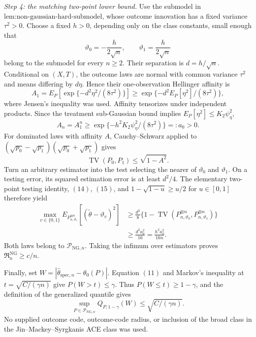 \emph{Step 4: the matching two-point lower bound.}
Use the submodel in \(\text{lem:non-gaussian-hard-submodel}\), whose outcome innovation has a fixed variance \(\tau^2>0\). Choose a fixed \(h>0\), depending only on the class constants, small enough that
\[
 \vartheta_0=-\frac{h}{2\sqrt n},
 \qquad
 \vartheta_1=\frac{h}{2\sqrt n}
\]
belong to the submodel for every \(n\ge2\). Their separation is \(d=h/\sqrt n\). Conditional on \((X,T)\), the outcome laws are normal with common variance \(\tau^2\) and means differing by \(d\eta\). Hence their one-observation Hellinger affinity is
\[
 A_1=E_P\!\left[\exp\{-d^2\eta^2/(8\tau^2)\}\right]
 \ge \exp\{-d^2E_P[\eta^2]/(8\tau^2)\}, \tag{13}
\]
where Jensen's inequality was used. Affinity tensorizes under independent products. Since the treatment sub-Gaussian bound implies \(E_P[\eta^2]\le K_2\psi_{\eta}^2\),
\[
 A_n=A_1^n
 \ge \exp\{-h^2K_2\psi_{\eta}^2/(8\tau^2)\}
 =:a_0>0. \tag{14}
\]
For dominated laws with affinity \(A\), Cauchy--Schwarz applied to \((\sqrt{p_0}-\sqrt{p_1})(\sqrt{p_0}+\sqrt{p_1})\) gives
\[
 \operatorname{TV}(P_0,P_1)\le\sqrt{1-A^2}. \tag{15}
\]
Turn an arbitrary estimator into the test selecting the nearer of \(\vartheta_0\) and \(\vartheta_1\). On a testing error, its squared estimation error is at least \(d^2/4\). The elementary two-point testing identity, \((14)\), \((15)\), and \(1-\sqrt{1-u}\ge u/2\) for \(u\in[0,1]\) therefore yield
\[
 \begin{aligned}
 \max_{v\in\{0,1\}}
 E_{P_{n,\vartheta_v}^{\otimes n}}[(\widetilde\theta-\vartheta_v)^2]
 &\ge \frac{d^2}{8}
 \{1-\operatorname{TV}(P_{n,\vartheta_0}^{\otimes n},P_{n,\vartheta_1}^{\otimes n})\}\\
 &\ge \frac{d^2a_0^2}{16}
 =\frac{h^2a_0^2}{16n}. \tag{16}
 \end{aligned}
\]
Both laws belong to \(\mathcal P_{\mathrm{NG},n}\). Taking the infimum over estimators proves \(\mathfrak R_n^{\mathrm{NG}}\ge c/n\).

Finally, set \(W=|\widehat\theta_{\mathrm{spec},n}-\theta_0(P)|\). Equation \((11)\) and Markov's inequality at \(t=\sqrt{C/(\gamma n)}\) give \(P(W>t)\le\gamma\). Thus \(P(W\le t)\ge1-\gamma\), and the definition of the generalized quantile gives
\[
 \sup_{P\in\mathcal P_{\mathrm{NG},n}}Q_{P,1-\gamma}(W)
 \le\sqrt{C/(\gamma n)}.
\]
No supplied outcome code, outcome-code radius, or inclusion of the broad class in the Jin--Mackey--Syrgkanis ACE class was used.